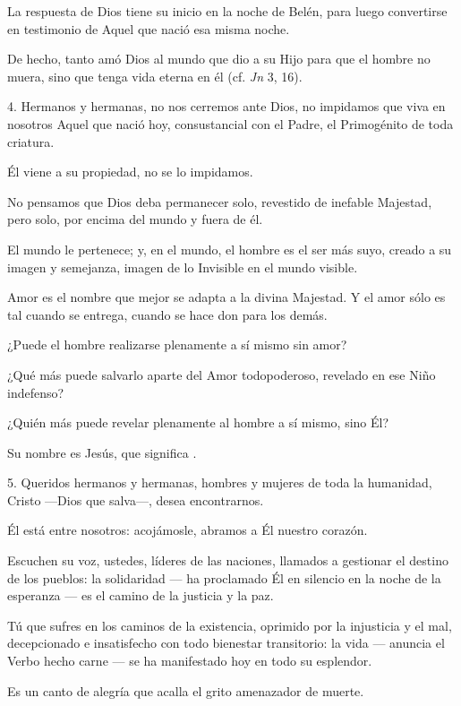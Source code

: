 \begin{body}
					La respuesta de Dios tiene su inicio en la noche de Belén, para luego convertirse en testimonio de Aquel que nació esa misma noche.
					
					De hecho, tanto amó Dios al mundo que dio a su Hijo para que el hombre no muera, sino que tenga vida eterna en él (cf. \emph{Jn} 3, 16).
					
					4. Hermanos y hermanas, no nos cerremos ante Dios, no impidamos que viva en nosotros Aquel que nació hoy, consustancial con el Padre, el Primogénito de toda criatura.
					
					Él viene a su propiedad, no se lo impidamos.
					
					No pensamos que Dios deba permanecer solo, revestido de inefable Majestad, pero solo, por encima del mundo y fuera de él.
					
					El mundo le pertenece; y, en el mundo, el hombre es el ser más suyo, creado a su imagen y semejanza, imagen de lo Invisible en el mundo visible.
					
					Amor es el nombre que mejor se adapta a la divina Majestad. Y el amor sólo es tal cuando se entrega, cuando se hace don para los demás.
					
					¿Puede el hombre realizarse plenamente a sí mismo sin amor?
					
					¿Qué más puede salvarlo aparte del Amor todopoderoso, revelado en ese Niño indefenso?
					
					¿Quién más puede revelar plenamente al hombre a sí mismo, sino Él?
					
					Su nombre es Jesús, que significa .
					
					5. Queridos hermanos y hermanas, hombres y mujeres de toda la humanidad, Cristo ---Dios que salva---, desea encontrarnos.
					
					Él está entre nosotros: acojámosle, abramos a Él nuestro corazón.
					
					Escuchen su voz, ustedes, líderes de las naciones, llamados a gestionar el destino de los pueblos: la solidaridad --- ha proclamado Él en silencio en la noche de la esperanza --- es el camino de la justicia y la paz.
					
					Tú que sufres en los caminos de la existencia, oprimido por la injusticia y el mal, decepcionado e insatisfecho con todo bienestar transitorio: la vida --- anuncia el Verbo hecho carne --- se ha manifestado hoy en todo su esplendor.
					
					Es un canto de alegría que acalla el grito amenazador de muerte.
					

\end{body}
